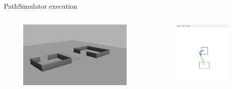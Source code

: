 \begin{frame}{Path}{Simulator execution}

\begin{columns}
\begin{figure}
\centering
\includegraphics[width = \textwidth]{./screenshot/Gazebo_running.png}
\end{figure}

\begin{minipage}{\textwidth}
\begin{figure}
\centering
\includegraphics[width = \textwidth]{./screenshot/path_execution.png}
\end{figure}
\end{minipage}
\end{columns}

\end{frame}

